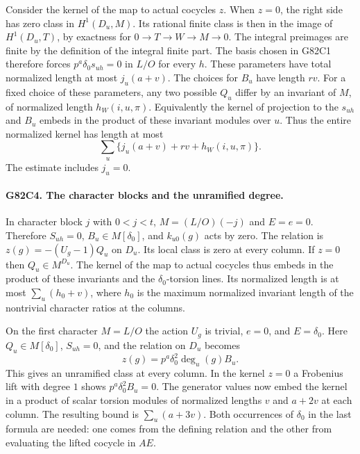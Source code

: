 Consider the kernel of the map to actual cocycles $z$. When $z=0$,
the right side has zero class in $H^1(D_u,M)$. Its rational
finite class is then in the image of $H^1(D_u,T)$, by exactness
for $0\to T\to W\to M\to0$. The integral preimages are finite
by the definition of the integral finite part. The basis chosen
in G82C1 therefore forces $p^a\delta_0 s_{uh}=0$ in $L/O$
for every $h$. These parameters have total normalized length at
most $j_u(a+v)$. The choices for $B_u$ have length $r v$.
For a fixed choice of these parameters, any two possible $Q_u$
differ by an invariant of $M$, of normalized length
$h_W(i,u,\pi)$. Equivalently the kernel of projection to the
$s_{uh}$ and $B_u$ embeds in the product of these invariant
modules over $u$. Thus the entire normalized kernel has length
at most
\[
             \sum_u \{j_u(a+v)+rv+h_W(i,u,\pi)\}.
\]
The estimate includes $j_u=0$.

\paragraph{G82C4. The character blocks and the unramified degree.}
In character block $j$ with $0<j<t$, $M=(L/O)(-j)$ and
$E=e=0$. Therefore $S_{uh}=0$, $B_u\in M[\delta_0]$, and
$k_{u0}(g)$ acts by zero. The relation is
$z(g)=-(U_g-1)Q_u$ on $D_u$. Its local class is zero at every
column. If $z=0$ then $Q_u\in M^{D_u}$. The kernel of the map
to actual cocycles thus embeds in the product of these invariants
and the $\delta_0$-torsion lines. Its normalized length is at
most $\sum_u(h_0+v)$, where $h_0$ is the maximum normalized
invariant length of the nontrivial character ratios at the columns.

On the first character $M=L/O$ the action $U_g$ is trivial,
$e=0$, and $E=\delta_0$. Here $Q_u\in M[\delta_0]$,
$S_{uh}=0$, and the relation on $D_u$ becomes
\[
                z(g)=p^a\delta_0^2\deg_u(g) B_u.
\]
This gives an unramified class at every column. In the kernel
$z=0$ a Frobenius lift with degree $1$ shows
$p^a\delta_0^2 B_u=0$. The generator values now embed the kernel
in a product of scalar torsion modules of normalized lengths $v$
and $a+2v$ at each column. The resulting bound is
$\sum_u(a+3v)$. Both occurrences of $\delta_0$ in the last
formula are needed: one comes from the defining relation and the
other from evaluating the lifted cocycle in $AE$.

